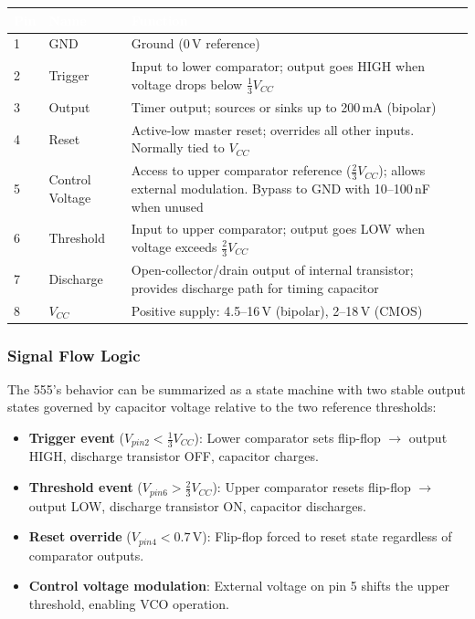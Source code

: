\documentclass[11pt,letterpaper]{article}
\newcommand{\tableheader}[1]{\textbf{\sffamily\textcolor{white}{#1}}}
\begin{document}
\begin{center}
\begin{tabularx}{\textwidth}{C{1cm}L{2.5cm}X}
\toprule
{}
\tableheader{Pin} & \tableheader{Name} & \tableheader{Function} \\
 & GND & Ground (0\,V reference) \\
2 & Trigger & Input to lower comparator; output goes HIGH when voltage drops below $\frac{1}{3}V_{CC}$ \\
3 & Output & Timer output; sources or sinks up to 200\,mA (bipolar) \\
4 & Reset & Active-low master reset; overrides all other inputs. Normally tied to $V_{CC}$ \\
5 & Control Voltage & Access to upper comparator reference ($\frac{2}{3}V_{CC}$); allows external modulation. Bypass to GND with 10--100\,nF when unused \\
6 & Threshold & Input to upper comparator; output goes LOW when voltage exceeds $\frac{2}{3}V_{CC}$ \\
7 & Discharge & Open-collector/drain output of internal transistor; provides discharge path for timing capacitor \\
8 & $V_{CC}$ & Positive supply: 4.5--16\,V (bipolar), 2--18\,V (CMOS) \\
\bottomrule
\end{tabularx}
\end{center}

\subsubsection{Signal Flow Logic}

The 555's behavior can be summarized as a state machine with two stable output states governed by capacitor voltage relative to the two reference thresholds:

\begin{itemize}[leftmargin=2em]
  \item \textbf{Trigger event} ($V_{pin2} < \frac{1}{3}V_{CC}$): Lower comparator sets flip-flop $\rightarrow$ output HIGH, discharge transistor OFF, capacitor charges.
  \item \textbf{Threshold event} ($V_{pin6} > \frac{2}{3}V_{CC}$): Upper comparator resets flip-flop $\rightarrow$ output LOW, discharge transistor ON, capacitor discharges.
  \item \textbf{Reset override} ($V_{pin4} < 0.7$\,V): Flip-flop forced to reset state regardless of comparator outputs.
  \item \textbf{Control voltage modulation}: External voltage on pin 5 shifts the upper threshold, enabling VCO operation.
\end{itemize}
\end{document}
